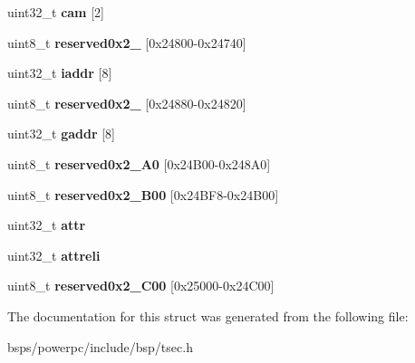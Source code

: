 \begin{DoxyCompactItemize}
uint32\+\_\+t {\bfseries cam} \mbox{[}2\mbox{]}
\item 
\mbox{\label{structtsec__registers_a670dd7e150b64ff570634eab1e0c0936}} 
uint8\+\_\+t {\bfseries reserved0x2\+\_} \mbox{[}0x24800-\/0x24740\mbox{]}
\item 
\mbox{\label{structtsec__registers_a059c2884c7999bc77c388457ce9449e3}} 
uint32\+\_\+t {\bfseries iaddr} \mbox{[}8\mbox{]}
\item 
\mbox{\label{structtsec__registers_a3599c8e13bf75514414a812777ec0791}} 
uint8\+\_\+t {\bfseries reserved0x2\+\_} \mbox{[}0x24880-\/0x24820\mbox{]}
\item 
\mbox{\label{structtsec__registers_a3ae6e77ccfaac7a15c150df87247e457}} 
uint32\+\_\+t {\bfseries gaddr} \mbox{[}8\mbox{]}
\item 
\mbox{\label{structtsec__registers_ab5d4aedfc204e44b6cd49dacfaa0e4f6}} 
uint8\+\_\+t {\bfseries reserved0x2\+\_\+A0} \mbox{[}0x24\+B00-\/0x248\+A0\mbox{]}
\item 
\mbox{\label{structtsec__registers_ad7d89710c884e16552551fc6366f5d21}} 
uint8\+\_\+t {\bfseries reserved0x2\+\_\+B00} \mbox{[}0x24\+B\+F8-\/0x24\+B00\mbox{]}
\item 
\mbox{\label{structtsec__registers_aad586fa2e7ae7dac2a8fa008a96d05dc}} 
uint32\+\_\+t {\bfseries attr}
\item 
\mbox{\label{structtsec__registers_acd6a43320f7e937e0b5a992093975be6}} 
uint32\+\_\+t {\bfseries attreli}
\item 
\mbox{\label{structtsec__registers_a026057b51a232e92619073616f4a2c2e}} 
uint8\+\_\+t {\bfseries reserved0x2\+\_\+C00} \mbox{[}0x25000-\/0x24\+C00\mbox{]}
\end{DoxyCompactItemize}


The documentation for this struct was generated from the following file\+:\begin{DoxyCompactItemize}
\item 
bsps/powerpc/include/bsp/tsec.\+h\end{DoxyCompactItemize}

